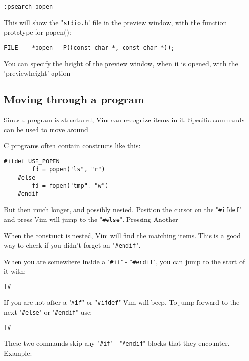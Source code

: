 \begin{Verbatim}[samepage=true]
 :psearch popen
\end{Verbatim}

This will show the "\verb!stdio.h!" file in the preview window, with the function prototype for popen():

\begin{Verbatim}[samepage=true]
    FILE    *popen __P((const char *, const char *)); 
\end{Verbatim}

You can specify the height of the preview window, when it is opened, with the 'previewheight' option.
\subsection{Moving through a program}
Since a program is structured, Vim can recognize items in it.
Specific commands can be used to move around.

C programs often contain constructs like this:

\begin{Verbatim}[samepage=true]
    #ifdef USE_POPEN 
        fd = popen("ls", "r") 
    #else 
        fd = fopen("tmp", "w") 
    #endif 
\end{Verbatim}

But then much longer, and possibly nested.
Position the cursor on the "\verb!#ifdef!" and press %
Vim will jump to the "\verb!#else!".
Pressing %
Another %

When the construct is nested, Vim will find the matching items.
This is a good way to check if you didn't forget an "\verb!#endif!".

When you are somewhere inside a "\verb!#if!" - "\verb!#endif!", you can jump to the start of it with:

\begin{Verbatim}[samepage=true]
 [#
\end{Verbatim}

If you are not after a "\verb!#if!" or "\verb!#ifdef!" Vim will beep.
To jump forward to the next "\verb!#else!" or "\verb!#endif!" use:

\begin{Verbatim}[samepage=true]
 ]#
\end{Verbatim}

These two commands skip any "\verb!#if!" - "\verb!#endif!" blocks that they encounter.
Example:

